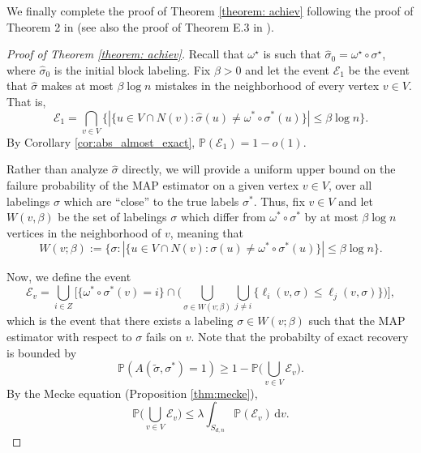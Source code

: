 \documentclass[11pt, a4paper]{amsart}
\renewcommand{\P}{\mathbb{P}}
\newcommand{\1}{\mathbf{1}}
\theoremstyle{definition}
\theoremstyle{remark}
\theoremstyle{definition}
\begin{document}
We finally complete the proof of Theorem \ref{theorem: achiev} following the proof of Theorem 2 in \cite{gaudio2026jan} (see also the proof of Theorem E.3 in \cite{gaudio2025incguan}).
\begin{proof}[Proof of Theorem \ref{theorem: achiev}]
Recall that $\omega^{\star}$ is such that $\hat{\sigma}_0 = \omega^{\star} \circ \sigma^{\star}$, where $\hat{\sigma}_0$ is the initial block labeling.
Fix $\beta > 0$ and let the event $\mathcal E_1$ be the event that $\hat{\sigma}$ makes at most $\beta \log n$ mistakes in the neighborhood of every vertex $v \in V$. That is,
\begin{equation*}
    \mathcal{E}_1 = \bigcap_{v \in V}\Big\{ |\{u \in V \cap N(v): \hat{\sigma}(u) \neq \omega^* \circ \sigma^*(u) \}| \leq \beta \log n \Big\}.
\end{equation*}
By Corollary \ref{cor:abs_almost_exact}, $\P(\mathcal E_1) = 1 - o(1)$.

Rather than analyze $\hat{\sigma}$ directly, we will provide a uniform upper bound on the failure probability of the MAP estimator on a given vertex $v \in V$, over all labelings $\sigma$ which are ``close'' to the true labels $\sigma^*$. Thus, fix $v \in V$ and let $W(v, \beta)$ be the set of labelings $\sigma$ which differ from $\omega^* \circ \sigma^*$ by at most $\beta \log n$ vertices in the neighborhood of $v$, meaning that
\begin{equation*}
    W(v; \beta) := \{\sigma: |\{u \in V \cap N(v): \sigma(u) \neq \omega^* \circ \sigma^*(u)\}| \leq \beta \log n\}.
\end{equation*}


Now, we define the event
\begin{equation*}
    \mathcal E_v = \bigcup_{i \in Z} \bigg[ \{\omega^* \circ \sigma^*(v) = i\} \cap \bigg( \bigcup_{\sigma \in W(v; \beta)} \bigcup_{j \neq i} \{\ell_i(v, \sigma) \leq \ell_j(v, \sigma) \}\bigg)\bigg],
\end{equation*}
which is the event that there exists a labeling $\sigma \in W(v; \beta)$ such that the MAP estimator with respect to $\sigma$ fails on $v$. 
Note that the probabilty of exact recovery is bounded by
\[
\P(A(\tilde \sigma,\sigma^*)=1) \ge 1-\P\Big(\bigcup_{v \in V} \mathcal E_v\Big).
\]
By the Mecke equation (Proposition \ref{thm:mecke}),
\[
\P\Big(\bigcup_{v \in V} \mathcal E_v\Big)\le \lambda \int_{S_{d,n}} \P(\mathcal E_v) \,\mathrm d v.
 \]


\end{proof}
\end{document}
